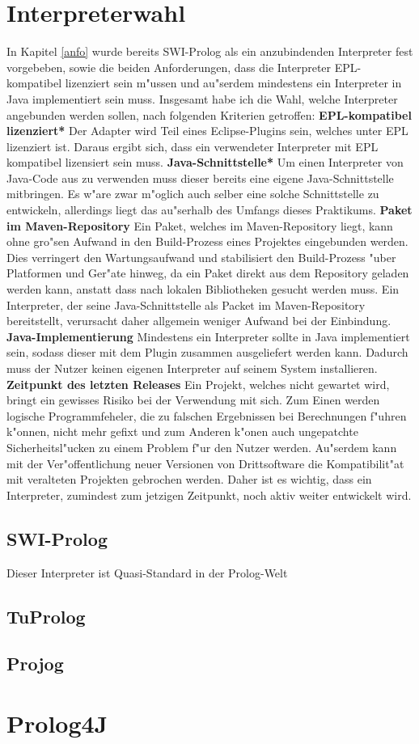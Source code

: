 \section{Interpreterwahl}
In Kapitel \ref{anfo} wurde bereits SWI-Prolog als ein anzubindenden Interpreter fest vorgebeben, sowie die beiden Anforderungen, dass die Interpreter EPL-kompatibel lizenziert sein m"ussen und au"serdem mindestens ein Interpreter in Java implementiert sein muss. \newline
Insgesamt habe ich die Wahl, welche Interpreter angebunden werden sollen, nach folgenden Kriterien getroffen:\newline
\newline
\textbf{EPL-kompatibel lizenziert*} Der Adapter wird Teil eines Eclipse-Plugins sein, welches unter EPL lizenziert ist. Daraus ergibt sich, dass ein verwendeter Interpreter mit EPL kompatibel lizensiert sein muss.\newline
\textbf{Java-Schnittstelle*} Um einen Interpreter von Java-Code aus zu verwenden muss dieser bereits eine eigene Java-Schnittstelle mitbringen. Es w"are zwar m"oglich auch selber eine solche Schnittstelle zu entwickeln, allerdings liegt das au"serhalb des Umfangs dieses Praktikums.\newline
\textbf{Paket im Maven-Repository} Ein Paket, welches im Maven-Repository liegt, kann ohne gro"sen Aufwand in den Build-Prozess eines Projektes eingebunden werden. Dies verringert den Wartungsaufwand und stabilisiert den Build-Prozess "uber Platformen und Ger"ate hinweg, da ein Paket direkt aus dem Repository geladen werden kann, anstatt dass nach lokalen Bibliotheken gesucht werden muss. Ein Interpreter, der seine Java-Schnittstelle als Packet im Maven-Repository bereitstellt, verursacht daher allgemein weniger Aufwand bei der Einbindung.\newline
\textbf{Java-Implementierung} Mindestens ein Interpreter sollte in Java implementiert sein, sodass dieser mit dem Plugin zusammen ausgeliefert werden kann. Dadurch muss der Nutzer keinen eigenen Interpreter auf seinem System installieren.\newline
\textbf{Zeitpunkt des letzten Releases} Ein Projekt, welches nicht gewartet wird, bringt ein gewisses Risiko bei der Verwendung mit sich. Zum Einen werden logische Programmfeheler, die zu falschen Ergebnissen bei Berechnungen f"uhren k"onnen, nicht mehr gefixt und zum Anderen k"onen auch ungepatchte Sicherheitsl"ucken zu einem Problem f"ur den Nutzer werden. Au"serdem kann mit der Ver"offentlichung neuer Versionen von Drittsoftware die Kompatibilit"at mit veralteten Projekten gebrochen werden. Daher ist es wichtig, dass ein Interpreter, zumindest zum jetzigen Zeitpunkt, noch aktiv weiter entwickelt wird.
\subsection{SWI-Prolog}
Dieser Interpreter ist Quasi-Standard in der Prolog-Welt
\subsection{TuProlog}
\subsection{Projog}

\section{Prolog4J}